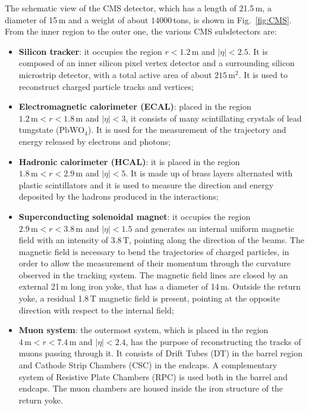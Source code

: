 The schematic view of the CMS detector, which has a length of 21.5\,m, a diameter of 15\,m and a weight of about $14000$\,tons, is shown in Fig.~\ref{fig:CMS}. From the inner region to the outer one, the various CMS subdetectors are:
\begin{itemize}
\item {\bf Silicon tracker}: it occupies the region $r < 1.2$\,m and $|\eta|<2.5$. It is composed of an inner silicon pixel vertex detector and a surrounding silicon microstrip detector, with a total active area of about $215\,\mathrm{m^2}$. It is used to reconstruct charged particle tracks and vertices;
\item {\bf Electromagnetic calorimeter (ECAL)}: placed in the region $1.2\,\mathrm{m} < r < 1.8\,\mathrm{m}$ and $|\eta|<3$, it consists of many scintillating crystals of lead tungstate ($\mathrm{PbWO_4}$). It is used for the measurement of the trajectory and energy released by electrons and photons;
\item {\bf Hadronic calorimeter (HCAL)}: it is placed in the region $1.8\,\mathrm{m} < r < 2.9\,\mathrm{m}$ and $|\eta|<5$. It is made up of brass layers alternated with plastic scintillators and it is used to measure the direction and energy deposited by the hadrons produced in the interactions;
\item {\bf Superconducting solenoidal magnet}: it occupies the region $2.9\,\mathrm{m} < r < 3.8\,\mathrm{m}$ and $|\eta|<1.5$ and generates an internal uniform magnetic field with an intensity of 3.8\,T, pointing along the direction of the beams. The magnetic field is necessary to bend the trajectories of charged particles, in order to allow the measurement of their momentum through the curvature observed in the tracking system. The magnetic field lines are closed by an external 21\,m long iron yoke, that has a diameter of 14\,m. Outside the return yoke, a residual 1.8\,T magnetic field is present, pointing at the opposite direction with respect to the internal field;
\item {\bf Muon system}: the outermost system, which is placed in the region $4\,\mathrm{m} < r < 7.4\,\mathrm{m}$ and $|\eta|<2.4$, has the purpose of reconstructing the tracks of muons passing through it. It consists of Drift Tubes (DT) in the barrel region and Cathode Strip Chambers (CSC) in the endcaps. A complementary system of Resistive Plate Chambers (RPC) is used both in the barrel and endcaps. The muon chambers are housed inside the iron structure of the return yoke.
\end{itemize}

